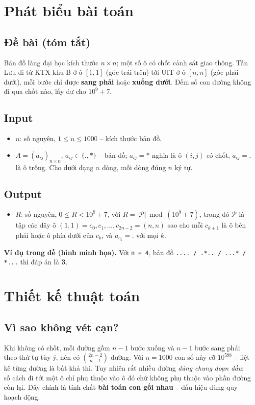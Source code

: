 \documentclass[12pt,a4paper]{article}
\begin{document}
\section{Phát biểu bài toán}
\subsection*{Đề bài (tóm tắt)}
Bản đồ làng đại học kích thước $n\times n$; một số ô có chốt cảnh sát giao thông. Tấn Lưu đi từ KTX khu B ở ô $[1,1]$ (góc trái trên) tới UIT ở ô $[n,n]$ (góc phải dưới), mỗi bước chỉ được \textbf{sang phải} hoặc \textbf{xuống dưới}. Đếm số con đường không đi qua chốt nào, lấy dư cho $10^9+7$.

\subsection*{Input}
\begin{itemize}
  \item $n$: số nguyên, $1 \le n \le 1000$ -- kích thước bản đồ.
  \item $A = (a_{ij})_{n\times n}$, $a_{ij} \in \{\texttt{.},\texttt{*}\}$ -- bản đồ; $a_{ij}=\texttt{*}$ nghĩa là ô $(i,j)$ có chốt, $a_{ij}=\texttt{.}$ là ô trống. Cho dưới dạng $n$ dòng, mỗi dòng đúng $n$ ký tự.
\end{itemize}
\subsection*{Output}
\begin{itemize}
  \item $R$: số nguyên, $0 \le R < 10^9+7$, với $R = |\mathcal P| \bmod (10^9+7)$, trong đó $\mathcal P$ là tập các dãy ô $(1,1)=c_0,c_1,\dots,c_{2n-2}=(n,n)$ sao cho mỗi $c_{k+1}$ là ô bên phải hoặc ô phía dưới của $c_k$, và $a_{c_k} = \texttt{.}$ với mọi $k$.
\end{itemize}

\begin{note}
\textbf{Ví dụ trong đề (hình minh họa).} Với
\texttt{n = 4}, bản đồ \texttt{....\,/\,.*..\,/\,...*\,/\,*...} thì đáp án là \textbf{3}.
\end{note}

\section{Thiết kế thuật toán}
\subsection{Vì sao không vét cạn?}
Khi không có chốt, mỗi đường gồm $n-1$ bước xuống và $n-1$ bước sang phải theo thứ tự tùy ý, nên có $\binom{2n-2}{n-1}$ đường. Với $n=1000$ con số này cỡ $10^{598}$ -- liệt kê từng đường là bất khả thi. Tuy nhiên rất nhiều đường \emph{dùng chung đoạn đầu}: số cách đi tới một ô chỉ phụ thuộc vào ô đó chứ không phụ thuộc vào phần đường còn lại. Đây chính là tính chất \textbf{bài toán con gối nhau} -- dấu hiệu dùng quy hoạch động.
\end{document}
